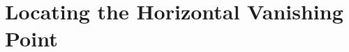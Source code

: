 

\begin{comment}
If we could identify the horizontal lines
first, we could easily intersect these to find the horizontal vanishing point.  Alternatively,
if we could find the vanishing point first, this would help us to separate the lines of text!
An initial attempt we made in bottom-up pixel grouping to distinguish lines was fraught with
problems such as the lack of global context
and the need to backtrack when two adjacent lines accidentally merge.
Our latest work has been in the extension of
a 2D principle to our 3D problem, which allows us to find the horizontal vanishing point
accurately, by using all of the global information at one time.  A simple algorithm will then
yield the separate lines of text, from which the vertical vanishing point is found.
\end{comment}



\section{Locating the Horizontal Vanishing Point}
\label{locatehvpsect}

